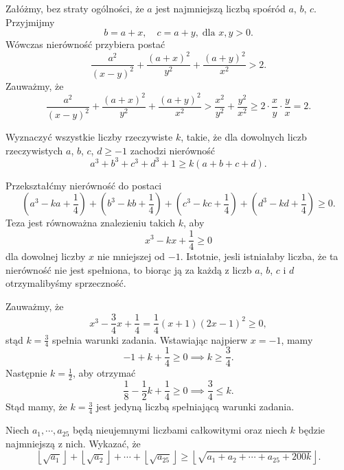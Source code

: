 \noindent
Załóżmy, bez straty ogólności, że $a$ jest najmniejszą liczbą spośród $a$, $b$, $c$. Przyjmijmy
\[
	b = a + x, \quad c = a + y, \; \text{dla } x, y > 0.
\]
Wówczas nierówność przybiera postać
\[
	\frac{a^2}{(x - y)^2} + \frac{(a + x)^2}{y^2} + \frac{(a + y)^2}{x^2} > 2.
\]
Zauważmy, że
\[
	\frac{a^2}{(x - y)^2} + \frac{(a + x)^2}{y^2} + \frac{(a + y)^2}{x^2} > \frac{x^2}{y^2} + \frac{y^2}{x^2} \geqslant 2 \cdot \frac{x}{y} \cdot \frac{y}{x} = 2.
\]

\begin{problem}{5}
Wyznaczyć wszystkie liczby rzeczywiste $k$, takie, że dla dowolnych liczb rzeczywistych $a$, $b$, $c$, $d \geqslant -1$ zachodzi nierówność
\[
	a^3 + b^3 + c^3 + d^3 + 1 \geqslant k(a + b + c + d).
\]
\end{problem}

\noindent
Przekształćmy nierówność do postaci
\[
	\left(a^3 - ka + \frac{1}{4}\right) + \left(b^3 - kb + \frac{1}{4}\right) + \left(c^3 - kc + \frac{1}{4}\right) + \left(d^3 - kd + \frac{1}{4}\right) \geqslant 0.
\]
Teza jest równoważna znalezieniu takich $k$, aby
\[
	x^3 - kx + \frac{1}{4} \geqslant 0
\]
dla dowolnej liczby $x$ nie mniejszej od $-1$. Istotnie, jesli istniałaby liczba, że ta nierówność nie jest spełniona, to biorąc ją za każdą z liczb $a$, $b$, $c$ i $d$ otrzymalibyśmy sprzeczność.

\noindent
Zauważmy, że
\[
	x^3 - \frac{3}{4}x + \frac{1}{4} = \frac{1}{4}(x + 1)(2x - 1)^2 \geqslant 0,
\]
stąd $k = \frac{3}{4}$ spełnia warunki zadania. Wstawiając najpierw $x = -1$, mamy
\[
	-1 + k + \frac{1}{4} \geqslant 0 \implies k \geqslant \frac{3}{4}.
\]
Następnie $k = \frac12$, aby otrzymać
\[
	\frac{1}{8} - \frac12k + \frac14 \geqslant 0 \implies \frac34 \leqslant k.
\]
Stąd mamy, że $k = \frac{3}{4}$ jest jedyną liczbą spełniającą warunki zadania.
\vspace{5px}

\begin{problem}{6}
Niech  $ a_1,\cdots , a_{25}$ będą nieujemnymi liczbami całkowitymi oraz niech $ k$ będzie najmniejszą z nich. Wykazać, że
\[
	\left\lfloor\sqrt{a_1}\right\rfloor + \left\lfloor\sqrt{a_2}\right\rfloor + \cdots + \left\lfloor\sqrt{a_{25}}\right\rfloor \geqslant \left\lfloor\sqrt{a_1 + a_2 + \cdots + a_{25} + 200k}\right\rfloor.
\]
\end{problem}

